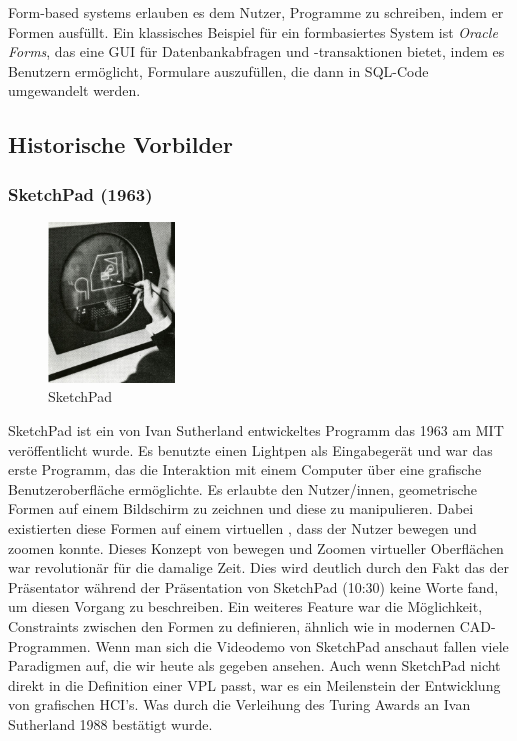 \documentclass[ngerman]{article}
\begin{document}
\subsubsection{}
Form-based systems erlauben es dem Nutzer, Programme zu schreiben, indem er Formen ausfüllt. Ein klassisches Beispiel für ein formbasiertes System ist \textit{Oracle Forms}, das eine GUI für Datenbankabfragen und -transaktionen bietet, indem es Benutzern ermöglicht, Formulare auszufüllen, die dann in SQL-Code umgewandelt werden.

\subsection{Historische Vorbilder}

\subsubsection{SketchPad (1963)}
\label{sec:SketchPad}
\begingroup
\setlength\intextsep{2pt}
\begin{minipage}{\linewidth}
\begin{figure}
  \centering
  \includegraphics[width=0.3\textwidth]{./graphics/sketchpad-sutherland.jpg} %
  \caption{SketchPad \cite{sutherlandSketchpad}}
\end{figure}
SketchPad ist ein von Ivan Sutherland entwickeltes Programm das 1963 am MIT veröffentlicht wurde. 
Es benutzte einen Lightpen als Eingabegerät und war das erste Programm, das die Interaktion mit einem Computer über eine grafische Benutzeroberfläche ermöglichte. 
Es erlaubte den Nutzer/innen, geometrische Formen auf einem Bildschirm zu zeichnen und diese zu manipulieren.
  Dabei existierten diese Formen auf einem virtuellen , dass der Nutzer bewegen und zoomen konnte. Dieses Konzept von bewegen und Zoomen virtueller Oberflächen war revolutionär für die damalige Zeit.
  Dies wird deutlich durch den Fakt das der Präsentator während der Präsentation von SketchPad \cite{sketchpadDemo} (10:30) keine Worte fand, um diesen Vorgang zu beschreiben.
Ein weiteres Feature war die Möglichkeit, Constraints zwischen den Formen zu definieren, ähnlich wie in modernen CAD-Programmen. 
Wenn man sich die Videodemo von SketchPad anschaut fallen viele Paradigmen auf, die wir heute als gegeben ansehen.
\br
Auch wenn SketchPad nicht direkt in die Definition einer VPL passt, war es ein Meilenstein der Entwicklung von grafischen HCI's. Was durch die Verleihung des Turing Awards an Ivan Sutherland 1988 bestätigt wurde.
\end{minipage}
\endgroup
\end{document}
